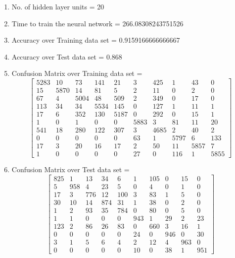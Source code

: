 \documentclass[11pt]{article}
\begin{document}
\hline
\begin{enumerate}
\item No. of hidden layer units = 20
\item Time to train the neural network = 266.08308243751526
\item Accuracy over Training data set = 0.9159166666666667
\item Accuracy over Test data set = 0.868
\item Confusion Matrix over Training data set = 
\begin{equation}
  \begin{bmatrix}
5283 & 10 & 73 & 141 & 21 & 3 & 425 & 1 & 43 & 0\\
15 & 5870 & 14 & 81 & 5 & 2 & 11 & 0 & 2 & 0\\
67 & 4 & 5004 & 48 & 509 & 2 & 349 & 0 & 17 & 0\\
113 & 34 & 34 & 5534 & 145 & 0 & 127 & 1 & 11 & 1\\
17 & 6 & 352 & 130 & 5187 & 0 & 292 & 0 & 15 & 1\\
1 & 0 & 1 & 0 & 0 & 5883 & 3 & 81 & 11 & 20\\
541 & 18 & 280 & 122 & 307 & 3 & 4685 & 2 & 40 & 2\\
0 & 0 & 0 & 0 & 0 & 63 & 1 & 5797 & 6 & 133\\
17 & 3 & 20 & 16 & 17 & 2 & 50 & 11 & 5857 & 7\\
1 & 0 & 0 & 0 & 0 & 27 & 0 & 116 & 1 & 5855
  \end{bmatrix}
\end{equation}
\item Confusion Matrix over Test data set = 
\begin{equation}
  \begin{bmatrix}
825 & 1 & 13 & 34 & 6 & 1 & 105 & 0 & 15 & 0\\
5 & 958 & 4 & 23 & 5 & 0 & 4 & 0 & 1 & 0\\
17 & 3 & 776 & 12 & 100 & 3 & 83 & 1 & 5 & 0\\
30 & 10 & 14 & 874 & 31 & 1 & 38 & 0 & 2 & 0\\
1 & 2 & 93 & 35 & 784 & 0 & 80 & 0 & 5 & 0\\
1 & 1 & 0 & 0 & 0 & 943 & 1 & 29 & 2 & 23\\
123 & 2 & 86 & 26 & 83 & 0 & 660 & 3 & 16 & 1\\
0 & 0 & 0 & 0 & 0 & 24 & 0 & 946 & 0 & 30\\
3 & 1 & 5 & 6 & 4 & 2 & 12 & 4 & 963 & 0\\
0 & 0 & 0 & 0 & 0 & 10 & 0 & 38 & 1 & 951
  \end{bmatrix}
\end{equation}
\end{enumerate}
\end{document}
